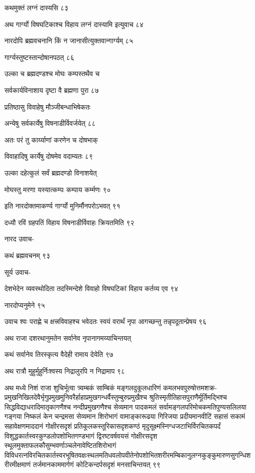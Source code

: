 कथमुक्तं लग्नं दास्यसि ८३

अथ गार्ग्यो विषघटिकाश्च विहाय लग्नं दास्यामि इत्युवाच ८४

नारदोपि ब्रह्मवचनानि किं न जानासीत्युक्तवान्गार्ग्यम् ८५

गार्ग्यस्तुष्टस्तान्दोषानपठत् ८६

उल्का च ब्रह्मदण्डश्च मोघः कम्पस्तथैव च

सर्वकार्यविनाशाय दृष्टा वै ब्रह्मणा पुरा ८७

प्रतिष्ठासु विवाहेषु मौञ्जीबन्धाभिषेकतः

अन्येषु सर्वकार्येषु विषनाडीर्विवर्जयेत् ८८

अतः परं तु कार्य्याणां करणेन च दोषभाक्

विवाहादिषु कार्येषु दोषमेव वदाम्यतः ८९

उल्का दहेत्कुलं सर्वं ब्रह्मदण्डो विनाशयेत्

मोघस्तु मरणा यस्यात्कम्पः कम्पाय कर्म्मणः ९०

इति नारदोक्तमाकर्ण्य गार्ग्यो मुनिर्मौनपरोऽभवत् ९१

दध्यौ रविं ग्रहपतिं विहाय विषनाडीर्विवाहः क्रियतमिति ९२

नारद उवाच-

कथं ब्रह्मवचनम् ९३

सूर्य उवाच-

देशभेदेन व्यवस्थोदिता तदस्मिन्देशे विवाहो विषघटिकां विहाय कर्तव्य एव ९४

नारदोप्यनुमेने ९५

उवाच श्वः पराह्णे च क्षत्त्रविवाहश्च भवेदतः स्वयं वरार्थं नृपा आगच्छन्तु तन्नृपदूतान्प्रेषय ९६

अथ राजा दशरथानुमतेन सर्वानेव नृपानागमय्याचिन्तयत्

कथं सर्वानेव तिरस्कृत्य वैदेही रामाय देयेति ९७

अथ रात्रौ मुहुर्मुहुर्निःश्वस्य निद्रालुरपि न निद्रामाप ९८

अथ मध्ये निशं राजा शुचिर्भूत्वा त्र्यम्बकं साम्बिकं मङ्गलदुकूलधारिणं
कमलभवपुरुषोत्तमशक्र-प्रमुखनिखिलदेवैर्भृगुप्रमुखमुनिवरैर्हाहाप्रमुखगन्धर्वैस्तुम्बुरुप्रमुखैश्च
श्रुतिस्मृतीतिहासपुराणैर्मूर्तिमद्भिश्च सिद्धविद्याधरादिमातृकागणैश्च नन्दीप्रमुखगणैश्च सेव्यमान
पादकमलं सर्वामङ्गलपरिमोचकमतिपुण्यसलिलया गङ्गया निष्कलं केन चन्द्रमसा सेव्यमान शिरोभागं
वामाङ्कारूढया गिरिजया प्रदीयमानवीटिं सहासं सकामं सहावेक्षणमाददानं गोक्षीरसदृशं
प्रतिकूलकस्तूरिकासदृशकण्ठं मृदुसूक्ष्मस्निग्धजटाभिर्विरचितकपर्दं
विशुद्धकार्तस्वरकुण्डलोपशोभितगण्डभागं द्विरष्टवर्षवयसं गोक्षीरसदृश
स्थूलमुक्ताफलकौसुम्भवर्णाञ्चलेनावेष्टितशिरोभागं
विविधरत्नविरचितकार्तस्वरभूषितवक्षःस्थलमतिधवलोपवीतेनोपशोभितशरीरमम्बिकानुलग्नकुङ्कुमारुणसुगन्धिशरीरमीक्षमाणं
तर्जमानकाममार्गणं कोटिकन्दर्पसदृशं मनसाचिन्तयत् ९९

